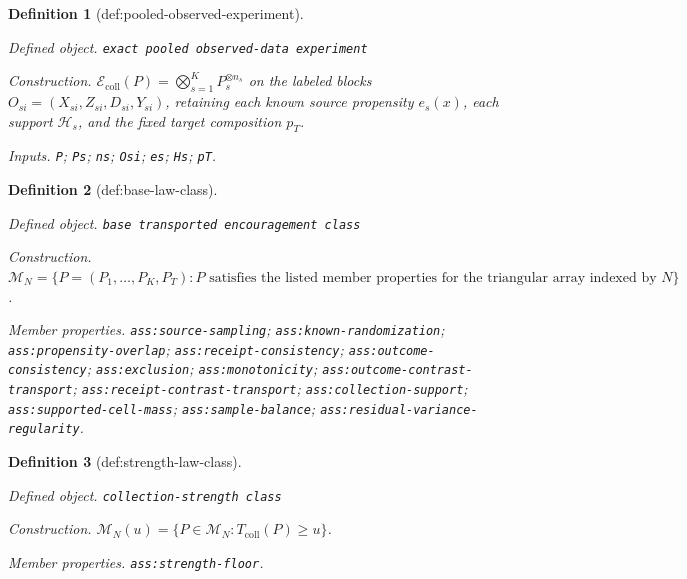 \documentclass{article}
\newtheorem{definition}{Definition}
\begin{document}
\begin{definition}[def:pooled-observed-experiment]\label{def:pooled-observed-experiment}
\par\smallskip\noindent\emph{Defined object.} \texttt{exact pooled observed-\allowbreak{}data experiment}
\par\smallskip\noindent\emph{Construction.} \(\mathcal E_{\mathrm{coll}}(P)=\bigotimes_{s=1}^K P_s^{\otimes n_s}\) on the labeled blocks \(O_{si}=(X_{si},Z_{si},D_{si},Y_{si})\), retaining each known source propensity \(e_s(x)\), each support \(\mathcal H_s\), and the fixed target composition \(p_T\).
\par\smallskip\noindent\emph{Inputs.} \texttt{P}; \texttt{Ps}; \texttt{ns}; \texttt{Osi}; \texttt{es}; \texttt{Hs}; \texttt{pT}.
\end{definition}

\begin{definition}[def:base-law-class]\label{def:base-law-class}
\par\smallskip\noindent\emph{Defined object.} \texttt{base transported encouragement class}
\par\smallskip\noindent\emph{Construction.} \(\mathcal M_N=\{P=(P_1,\ldots,P_K,P_T):P\text{ satisfies the listed member properties for the triangular array indexed by }N\}\).
\par\smallskip\noindent\emph{Member properties.} \texttt{ass:\allowbreak{}source-\allowbreak{}sampling}; \texttt{ass:\allowbreak{}known-\allowbreak{}randomization}; \texttt{ass:\allowbreak{}propensity-\allowbreak{}overlap}; \texttt{ass:\allowbreak{}receipt-\allowbreak{}consistency}; \texttt{ass:\allowbreak{}outcome-\allowbreak{}consistency}; \texttt{ass:\allowbreak{}exclusion}; \texttt{ass:\allowbreak{}monotonicity}; \texttt{ass:\allowbreak{}outcome-\allowbreak{}contrast-\allowbreak{}transport}; \texttt{ass:\allowbreak{}receipt-\allowbreak{}contrast-\allowbreak{}transport}; \texttt{ass:\allowbreak{}collection-\allowbreak{}support}; \texttt{ass:\allowbreak{}supported-\allowbreak{}cell-\allowbreak{}mass}; \texttt{ass:\allowbreak{}sample-\allowbreak{}balance}; \texttt{ass:\allowbreak{}residual-\allowbreak{}variance-\allowbreak{}regularity}.
\end{definition}

\begin{definition}[def:strength-law-class]\label{def:strength-law-class}
\par\smallskip\noindent\emph{Defined object.} \texttt{collection-\allowbreak{}strength class}
\par\smallskip\noindent\emph{Construction.} \(\mathcal M_N(u)=\{P\in\mathcal M_N:T_{\mathrm{coll}}(P)\ge u\}\).
\par\smallskip\noindent\emph{Member properties.} \texttt{ass:\allowbreak{}strength-\allowbreak{}floor}.
\end{definition}
\end{document}
